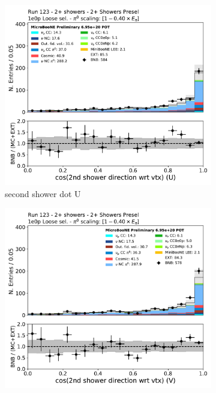 \begin{figure}[H]
    \centering
    \begin{subfigure}{0.3\textwidth}
    \includegraphics[width=1.0\textwidth]{Sidebands/Figures/TwoShr_1e0pSel/loose/secondshower_U_dot.pdf}
    \caption{second shower dot U}
    \end{subfigure}
    \begin{subfigure}{0.3\textwidth}
    \includegraphics[width=1.0\textwidth]{Sidebands/Figures/TwoShr_1e0pSel/loose/secondshower_V_dot.pdf}

\end{subfigure}
\end{figure}
